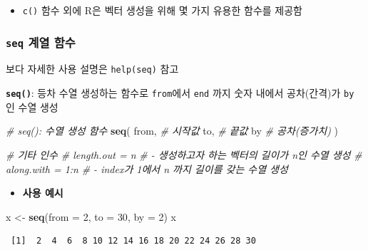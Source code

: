 \documentclass[
  11pt,
]{krantz}
\makeatletter
\newenvironment{Shaded}{\begin{snugshade}}{\end{snugshade}}
\newcommand{\CommentTok}[1]{\textcolor[rgb]{0.37,0.37,0.37}{\textit{#1}}}
\newcommand{\DataTypeTok}[1]{\textcolor[rgb]{0.27,0.27,0.27}{#1}}
\newcommand{\DecValTok}[1]{\textcolor[rgb]{0.06,0.06,0.06}{#1}}
\newcommand{\KeywordTok}[1]{\textcolor[rgb]{0.27,0.27,0.27}{\textbf{#1}}}
\newcommand{\NormalTok}[1]{#1}
\newcommand{\StringTok}[1]{\textcolor[rgb]{0.5,0.5,0.5}{#1}}
\providecommand{\tightlist}{%
  \setlength{\itemsep}{0pt}\setlength{\parskip}{0pt}}
\newenvironment{kframe}{%
\medskip{}
\setlength{\fboxsep}{.8em}
 \def\at@end@of@kframe{}%
 \ifinner\ifhmode%
  \def\at@end@of@kframe{\end{minipage}}%
  \begin{minipage}{\columnwidth}%
 \fi\fi%
 \def\FrameCommand##1{\hskip\@totalleftmargin \hskip-\fboxsep
 \colorbox{shadecolor}{##1}\hskip-\fboxsep
     \hskip-\linewidth \hskip-\@totalleftmargin \hskip\columnwidth}%
 \MakeFramed {\advance\hsize-\width
   \@totalleftmargin\z@ \linewidth\hsize
   \@setminipage}}%
 {\par\unskip\endMakeFramed%
 \at@end@of@kframe}
\renewenvironment{quote}{\begin{kframe}}{\end{kframe}}
\makeatother
\begin{document}
\begin{itemize}
\tightlist
\item
  \texttt{c()} 함수 외에 R은 벡터 생성을 위해 몇 가지 유용한 함수를 제공함
\end{itemize}

\hypertarget{fun-seq}{%
\subsubsection*{\texorpdfstring{\textbf{\texttt{seq}} 계열 함수}{seq 계열 함수}}\label{fun-seq}}


\begin{quote}
보다 자세한 사용 설명은 \texttt{help(seq)} 참고
\end{quote}

\textbf{\texttt{seq()}}: 등차 수열 생성하는 함수로 \texttt{from}에서 \texttt{end} 까지 숫자 내에서 공차(간격)가 \texttt{by} 인 수열 생성

\footnotesize

\begin{Shaded}
\begin{Highlighting}[]
\CommentTok{# seq(): 수열 생성 함수}
\KeywordTok{seq}\NormalTok{(}
\NormalTok{  from, }\CommentTok{# 시작값}
\NormalTok{  to,   }\CommentTok{# 끝값}
\NormalTok{  by    }\CommentTok{# 공차(증가치)}
\NormalTok{)}

\CommentTok{# 기타 인수}
\CommentTok{# length.out = n}
\CommentTok{#   - 생성하고자 하는 벡터의 길이가 n인 수열 생성}
\CommentTok{# along.with = 1:n }
\CommentTok{#   - index가 1에서 n 까지 길이를 갖는 수열 생성}
\end{Highlighting}
\end{Shaded}

\normalsize

\begin{itemize}
\tightlist
\item
  \textbf{사용 예시}
\end{itemize}

\footnotesize

\begin{Shaded}
\begin{Highlighting}[]
\NormalTok{x <-}\StringTok{ }\KeywordTok{seq}\NormalTok{(}\DataTypeTok{from =} \DecValTok{2}\NormalTok{, }\DataTypeTok{to =} \DecValTok{30}\NormalTok{, }\DataTypeTok{by =} \DecValTok{2}\NormalTok{)}
\NormalTok{x }
\end{Highlighting}
\end{Shaded}

\begin{verbatim}
 [1]  2  4  6  8 10 12 14 16 18 20 22 24 26 28 30
\end{verbatim}
\end{document}
